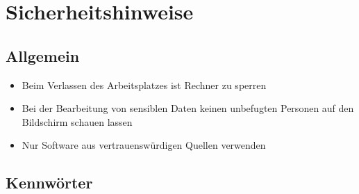 \section{Sicherheitshinweise}

\subsection{Allgemein}

\begin{frame}
\begin{itemize}
	\item Beim Verlassen des Arbeitsplatzes ist Rechner zu sperren
	\item Bei der Bearbeitung von sensiblen Daten keinen unbefugten Personen auf den Bildschirm schauen lassen
	\item Nur Software aus vertrauenswürdigen Quellen verwenden
\end{itemize}
\end{frame}

\subsection{Kennwörter}



